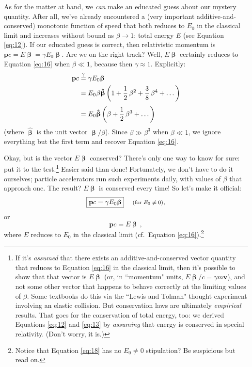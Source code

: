 \documentclass[12pt]{article}
\renewcommand{\vv}[1]{\mathbf{#1}}
\newcommand{\vvbeta}{\bm{\upbeta}}
\newcommand{\hatbeta}{\bm{\hat{\upbeta}}}
\begin{document}
As for the matter at hand, we \emph{can} make an educated guess about our mystery quantity. After all, we've already encountered a (very important additive-and-conserved) monotonic function of speed that both reduces to $E_0$ in the classical limit and increases without bound as $\beta \rightarrow 1$: total energy $E$ (see Equation \ref{eq:12}). If our educated guess is correct, then relativistic momentum is $\vv p c = E \vvbeta = \gamma E_0 \vvbeta$. Are we on the right track? Well, $E \vvbeta$ certainly reduces to Equation \ref{eq:16} when $\beta \ll 1$, because then $\gamma \approx 1$. Explicitly:
\begin{equation*}\begin{split}
\vv p c &\stackrel{?}{=}\gamma E_0 \vvbeta \\
&= E_0 \mkern.5mu \beta \hatbeta \left( 1 + \dfrac{1}{2} \, \beta ^2 +  \dfrac {3}{8} \, \beta ^4 + \dots  \right) \\[3pt]
&= E_0 \hatbeta \left( \beta + \dfrac{1}{2} \, \beta^3 + \dots \right)
\end{split}\end{equation*}
(where $\hatbeta$ is the unit vector $\vvbeta / \beta$). Since $\beta \gg \beta^3$ when $\beta \ll 1$, we ignore everything but the first term and recover Equation \ref{eq:16}.

Okay, but is the vector $E \vvbeta$ conserved? There's only one way to know for sure: put it to the test.\footnote{If it's \emph{assumed} that there exists an additive-and-conserved vector quantity that reduces to Equation \ref{eq:16} in the classical limit, then it's possible to show that that vector is $E \vvbeta$ (or, in ``momentum" units, $E \vvbeta/c = \gamma m \vv v$), and not some other vector that happens to behave correctly at the limiting values of $\beta$. Some textbooks do this via the ``Lewis and Tolman" thought experiment involving an elastic collision. But conservation laws are ultimately \emph{empirical} results. That goes for the conservation of total energy, too: we derived Equations \ref{eq:12} and \ref{eq:13} by \emph{assuming} that energy is conserved in special relativity. (Don't worry, it is.)} Easier said than done! Fortunately, we don't have to do it ourselves; particle accelerators run such experiments daily, with values of $\beta$ that approach one. The result? $E \vvbeta$ is conserved every time! So let's make it official:
\begin{equation}\label{eq:17}
\boxed{\vv p c = \gamma E_0 \vvbeta}  \quad \textrm{\footnotesize{ (for $E_0 \neq 0$)}},
\end{equation}
or
\begin{equation}\label{eq:18}
\boxed{\vv p c = E \vvbeta} \, ,
\end{equation}
where $E$ reduces to $E_0$ in the classical limit (cf.\ Equation \ref{eq:16}).\footnote{Notice that Equation \ref{eq:18} has no $E_0 \neq 0$ stipulation? Be suspicious but read on.}
\end{document}
